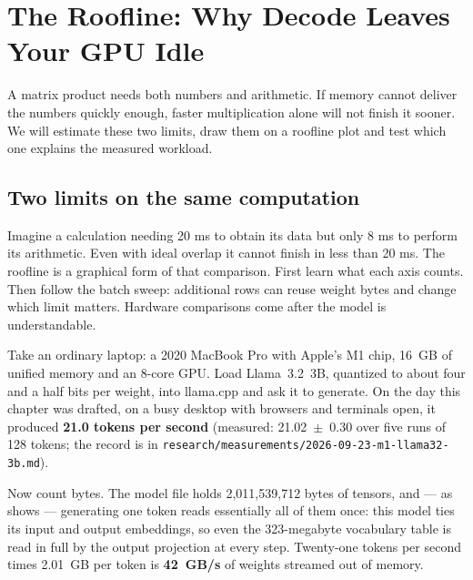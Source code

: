 \chapter{The Roofline: Why Decode Leaves Your GPU Idle}\label{ch:roofline}

\begin{ChapterIntent}
A matrix product needs both numbers and arithmetic. If memory cannot deliver the numbers
quickly enough, faster multiplication alone will not finish it sooner. We will estimate
these two limits, draw them on a roofline plot and test which one explains the measured
workload.
\end{ChapterIntent}

\section*{Two limits on the same computation}
Imagine a calculation needing 20 ms to obtain its data but only 8 ms to perform its
arithmetic. Even with ideal overlap it cannot finish in less than 20 ms. The roofline is
a graphical form of that comparison. First learn what each axis counts. Then follow the
batch sweep: additional rows can reuse weight bytes and change which limit matters.
Hardware comparisons come after the model is understandable.


Take an ordinary laptop: a 2020 MacBook Pro with Apple's M1 chip, 16~GB of
unified memory and an 8-core GPU. Load Llama~3.2~3B, quantized to about four
and a half bits per weight, into llama.cpp and ask it to generate. On the day
this chapter was drafted, on a busy desktop with browsers and terminals open,
it produced \textbf{21.0 tokens per second} (measured: 21.02~$\pm$~0.30 over
five runs of 128 tokens; the record is in
\texttt{research/measurements/2026-09-23-m1-llama32-3b.md}).

Now count bytes. The model file holds 2,011,539,712 bytes of tensors, and ---
as  shows --- generating one token reads essentially all
of them once: this model ties its input and output embeddings, so even the
323-megabyte vocabulary table is read in full by the output projection at
every step. Twenty-one tokens per second times 2.01~GB per token is
\textbf{42~GB/s} of weights streamed out of memory.

